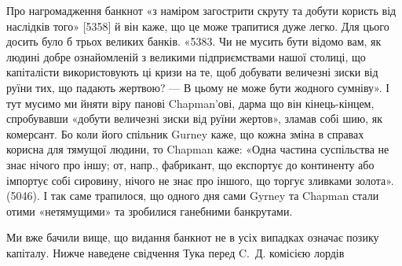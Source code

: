 Про нагромадження банкнот «з наміром загострити скруту та добути
користь від наслідків того» [5358] й він каже, що це може трапитися дуже
легко. Для цього досить було б трьох великих банків. «5383. Чи не мусить
бути відомо вам, як людині добре ознайомленій з великими підприємствами
нашої столиці, що капіталісти використовують ці кризи на те, щоб добувати
величезні зиски від руїни тих, що падають жертвою? — В цьому не може
бути жодного сумніву». І тут мусимо ми йняти віру панові Chapman’ові, дарма
що він кінець-кінцем, спробувавши «добути величезні зиски від руїни жертов»,
зламав собі шию, як комерсант. Бо коли його спільник Gurney каже, що кожна
зміна в справах корисна для тямущої людини, то Chapman каже: «Одна
частина суспільства не знає нічого про іншу; от, напр., фабрикант, що експортує
до континенту або імпортує собі сировину, нічого не знає про іншого,
що торгує зливками золота». (5046). І так саме трапилося, що одного дня
сами Gyrney та Chapman стали отими «нетямущими» та зробилися ганебними
банкрутами.

Ми вже бачили вище, що видання банкнот не в усіх випадках означає
позику капіталу. Нижче наведене свідчення Тука перед C.~Д. комісією лордів
\parbreak{}  %
